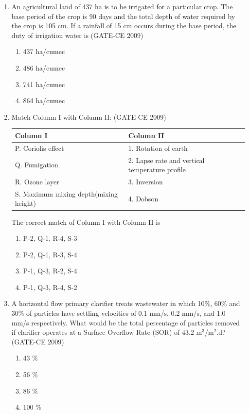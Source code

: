 \documentclass[12pt]{article}
\begin{document}
\begin{enumerate}[label=Q.\arabic*]
    \item An agricultural land of 437 ha is to be irrigated for a particular crop. The base period of the crop is 90 days and the total depth of water required by the crop is 105 cm. If a rainfall of 15 cm occurs during the base period, the duty of irrigation water is (GATE-CE 2009)
    \begin{enumerate}[label=(\Alph*)]
        \item 437 ha/cumec 
        \item 486 ha/cumec 
        \item 741 ha/cumec 
        \item 864 ha/cumec
    \end{enumerate}
    

    \item Match Column I with Column II: (GATE-CE 2009)
    \begin{center}
    \begin{tabular}{|l|l|}
    \hline
    \textbf{Column I} & \textbf{Column II} \\
    \hline
    P. Coriolis effect & 1. Rotation of earth \\
    Q. Fumigation & 2. Lapse rate and vertical temperature profile \\
    R. Ozone layer & 3. Inversion \\
    S. Maximum mixing depth(mixing height) & 4. Dobson \\
    \hline
    \end{tabular}
    \end{center}
    The correct match of Column I with Column II is
    \begin{enumerate}[label=(\Alph*)]
        \item P-2, Q-1, R-4, S-3 
        \item P-2, Q-1, R-3, S-4 
        \item P-1, Q-3, R-2, S-4 
        \item P-1, Q-3, R-4, S-2
    \end{enumerate}
    
    \item A horizontal flow primary clarifier treats wastewater in which 10\%, 60\% and 30\% of particles have settling velocities of 0.1 mm/s, 0.2 mm/s, and 1.0 mm/s respectively. What would be the total percentage of particles removed if clarifier operates at a Surface Overflow Rate (SOR) of 43.2 m$^3$/m$^2$.d? (GATE-CE 2009)
    \begin{enumerate}[label=(\Alph*)]
        \item 43 \% 
        \item 56 \% 
        \item 86 \% 
        \item 100 \%
    \end{enumerate}
    

\end{enumerate}
\end{document}
